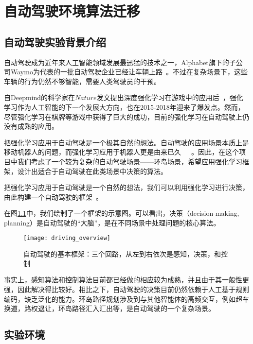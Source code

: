\chapter{自动驾驶环境算法迁移}
\section{自动驾驶实验背景介绍}
自动驾驶成为近年来人工智能领域发展最迅猛的技术之一，Alphabet旗下的子公司Waymo为代表的一批自动驾驶企业已经让车辆上路~\cite{waymo}。不过在复杂场景下，这些车辆的行为仍然不够智能，需要人类驾驶员的干预。\par
自Deepmind的科学家在$Nature$发文提出深度强化学习在游戏中的应用后~\cite{nature2015}，强化学习作为人工智能的下一个发展大方向，也在2015-2018年迎来了爆发点。然而，尽管强化学习在棋牌等游戏中获得了巨大的成功，目前的强化学习在自动驾驶上仍没有成熟的应用。\par
把强化学习应用于自动驾驶是一个极其自然的想法。自动驾驶的应用场景本质上是移动机器人的问题，而强化学习应用于机器人更是由来已久~\cite{RL_in_robotics}~\cite{Model-Based_RL_robotics}~\cite{DRL_for_driving}。因此，在这个项目中我们考虑了一个较为复杂的自动驾驶场景——环岛场景，希望应用强化学习框架，设计出适合于自动驾驶在此类场景中决策的算法。

把强化学习应用于自动驾驶是一个自然的想法，我们可以利用强化学习进行决策，由此构建一个自动驾驶的框架~\cite{DRL_for_driving}。\par
在图\ref{fig:self-driving_overview}中，我们绘制了一个框架的示意图。可以看出，决策（decision-making, planning）是自动驾驶的``大脑''，是在不同场景中处理问题的核心算法。\par
      \begin{figure}[h] %
        \centering
        \texttt{[image: driving\_overview]}
        \caption{自动驾驶的基本框架：三个回路，从左到右依次是感知，决策，和控制}
        \label{fig:self-driving_overview}
      \end{figure}
事实上，感知算法和控制算法目前都已经做的相应较为成熟，并且由于其一般性更强，因此解决得比较好。相比之下，自动驾驶的决策目前仍然依赖于人工基于规则编码，缺乏泛化的能力。环岛路径规划涉及到与其他智能体的高频交互，例如超车换道，路权退让，环岛路径汇入汇出等，是自动驾驶的一个复杂场景。

  
\section{实验环境}
